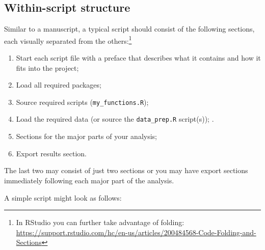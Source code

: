 \documentclass[12pt,letterpaper]{article}
\begin{document}
\subsection{Within-script structure}

Similar to a manuscript, a typical script should consist of the following sections, each visually separated from the others:\footnote{In RStudio you can further take advantage of folding: \url{https://support.rstudio.com/hc/en-us/articles/200484568-Code-Folding-and-Sections}}

\begin{enumerate}

	\item Start each script file with a preface that describes what it contains and how it fits into the project;

	\item Load all required packages;

	\item Source required scripts (\texttt{my\_functions.R});

	\item Load the required data (or source the \texttt{data\_prep.R} script(s));
.
	\item Sections for the major parts of your analysis;

	\item Export results section.

\end{enumerate}
The last two may consist of just two sections or you may have export sections immediately following each major part of the analysis.

A simple script might look as follows:
\end{document}
